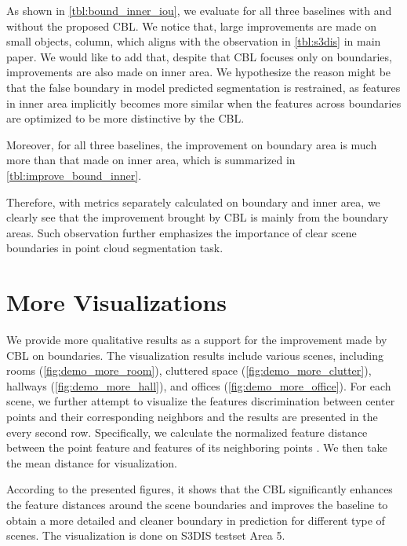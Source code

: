 \documentclass[10pt,twocolumn,letterpaper]{article}
\begin{document}
As shown in \cref{tbl:bound_inner_iou}, we evaluate for all three baselines with and without the proposed CBL.
We notice that, large improvements are made on small objects, \eg column, which aligns with the observation  in \cref{tbl:s3dis} in main paper. We would like to add that, despite that CBL focuses only on boundaries, improvements are also made on inner area. We hypothesize the reason might be that the false boundary in model predicted segmentation is restrained, as features in inner area implicitly becomes more similar when the features across boundaries are optimized to be more distinctive by the CBL.

Moreover, for all three baselines, the improvement on boundary area is much more than that made on inner area, which is summarized in \cref{tbl:improve_bound_inner}.

Therefore, with metrics separately calculated on boundary and inner area, we clearly see that the improvement brought by CBL is mainly from the boundary areas. Such observation further emphasizes the importance of clear scene boundaries in point cloud segmentation task.

\section{More Visualizations}
\label{sec:sup:vis}
We provide more qualitative results as a support for the improvement made by CBL on boundaries.
The visualization results include various scenes, including rooms (\cref{fig:demo_more_room}), cluttered space (\cref{fig:demo_more_clutter}), hallways (\cref{fig:demo_more_hall}), and offices (\cref{fig:demo_more_office}). For each scene, we further attempt to visualize the features discrimination between center points and their corresponding neighbors and the results are presented in the every second row. Specifically, we calculate the normalized feature distance between the point feature  and features of its neighboring points . We then take the mean distance for visualization.

According to the presented figures, it shows that the CBL significantly enhances the feature distances around the scene boundaries and improves the baseline to obtain a more detailed and cleaner boundary in prediction for different type of scenes. The visualization is done on S3DIS testset Area 5.
\end{document}
